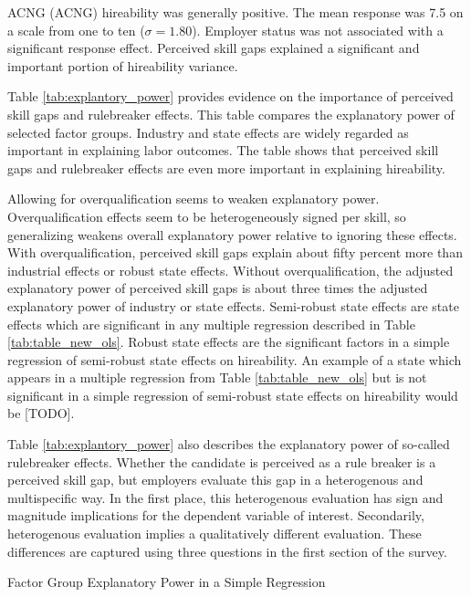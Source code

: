 \documentclass[review]{elsarticle}
\begin{document}

ACNG (ACNG) hireability was generally positive.
The mean response was 7.5 on a scale from one to ten ($\sigma = 1.80$).
Employer status was not associated with a significant response effect.
Perceived skill gaps explained a significant and important portion of hireability variance.

Table \ref{tab:explantory_power} provides evidence on the importance of perceived skill gaps and rulebreaker effects.
This table compares the explanatory power of selected factor groups.
Industry and state effects are widely regarded as important in explaining labor outcomes.
The table shows that perceived skill gaps and rulebreaker effects are even more important in explaining hireability.

Allowing for overqualification seems to weaken explanatory power.
Overqualification effects seem to be heterogeneously signed per skill, so generalizing weakens overall explanatory power relative to ignoring these effects.
With overqualification, perceived skill gaps explain about fifty percent more than industrial effects or robust state effects.
Without overqualification, the adjusted explanatory power of perceived skill gaps is about three times the adjusted explanatory power of industry or state effects.
Semi-robust state effects are state effects which are significant in any multiple regression described in Table \ref{tab:table_new_ols}.
Robust state effects are the significant factors in a simple regression of semi-robust state effects on hireability.
An example of a state which appears in a multiple regression from Table \ref{tab:table_new_ols} but is not significant in a simple regression of semi-robust state effects on hireability would be [TODO].

Table \ref{tab:explantory_power} also describes the explanatory power of so-called rulebreaker effects.
Whether the candidate is perceived as a rule breaker is a perceived skill gap, but employers evaluate this gap in a heterogenous and multispecific way.
In the first place, this heterogenous evaluation has sign and magnitude implications for the dependent variable of interest.
Secondarily, heterogenous evaluation implies a qualitatively different evaluation.
These differences are captured using three questions in the first section of the survey.

\begin{table}
    \caption{Factor Group Explanatory Power in a Simple Regression}
    \resizebox{\columnwidth}{!}{
        
    }
    \label{tab:explantory_power}
\end{table}
\end{document}
